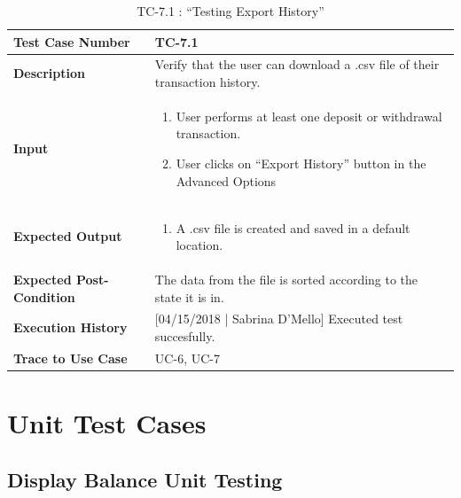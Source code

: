 \documentclass[12pt]{article}
\begin{document}
\begin{table}[H]
\caption{TC-7.1 : “Testing Export History”}
\begin{center}
\begin{tabular}{|p{5.5	cm}|p{11cm}|}
  \hline
  \bf Test Case Number & TC-7.1\\\hline
  \bf Description & Verify that the user can download a .csv file of their transaction history.\\\hline
  \bf Input &
  \begin{enumerate}
  \item User performs at least one deposit or withdrawal transaction.
  \item User clicks on ``Export History'' button in the Advanced Options
  \end{enumerate}
  \\\hline
  \bf Expected Output &
  \begin{enumerate}
  \item A .csv file is created and saved in a default location.
  \end{enumerate}
  \\\hline
  \bf Expected Post-Condition & The data from the file is sorted according to the state it is in.\\\hline
  \bf Execution History & [04/15/2018 | Sabrina D'Mello] Executed test succesfully.\\\hline
  \bf Trace to Use Case & UC-6, UC-7\\

  \hline
\end{tabular}
\end{center}
\end{table}

\section{Unit Test Cases}

\subsection{Display Balance Unit Testing} \label{ut:1}
\end{document}

